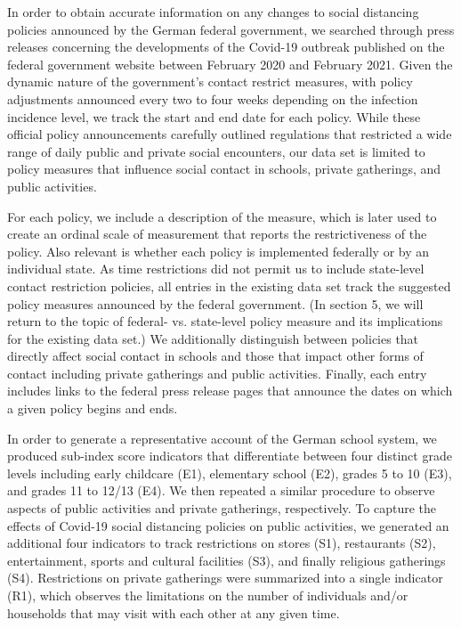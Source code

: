 In order to obtain accurate information on any changes to social distancing policies announced by the German federal government, we searched through press releases concerning the developments of the Covid-19 outbreak published on the federal government website between February 2020 and February 2021. Given the dynamic nature of the government’s contact restrict measures, with policy adjustments announced every two to four weeks depending on the infection incidence level, we track the start and end date for each policy. While these official policy announcements carefully outlined regulations that restricted a wide range of daily public and private social encounters, our data set is limited to policy measures that influence social contact in schools, private gatherings, and public activities.

For each policy, we include a description of the measure, which is later used to create an ordinal scale of measurement that reports the restrictiveness of the policy. Also relevant is whether each policy is implemented federally or by an individual state. As time restrictions did not permit us to include state-level contact restriction policies, all entries in the existing data set track the suggested policy measures announced by the federal government. (In section 5, we will return to the topic of federal- vs. state-level policy measure and its implications for the existing data set.) We additionally distinguish between policies that directly affect social contact in schools and those that impact other forms of contact including private gatherings and public activities. Finally, each entry includes links to the federal press release pages that announce the dates on which a given policy begins and ends.

In order to generate a representative account of the German school system, we produced sub-index score indicators that differentiate between four distinct grade levels including early childcare (E1), elementary school (E2), grades 5 to 10 (E3), and grades 11 to 12/13 (E4). We then repeated a similar procedure to observe aspects of public activities and private gatherings, respectively. To capture the effects of Covid-19 social distancing policies on public activities, we generated an additional four indicators to track restrictions on stores (S1), restaurants (S2), entertainment, sports and cultural facilities (S3), and finally religious gatherings (S4). Restrictions on private gatherings were summarized into a single indicator (R1), which observes the limitations on the number of individuals and/or households that may visit with each other at any given time.

